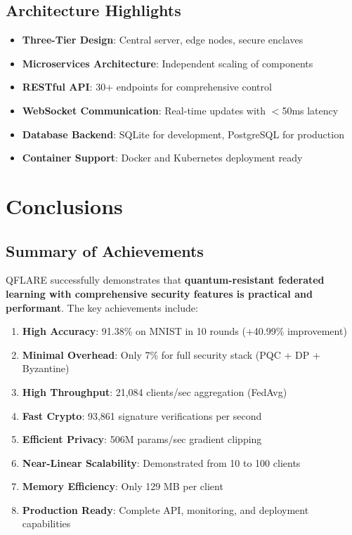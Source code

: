 \documentclass[12pt,a4paper]{article}
\begin{document}
\subsection{Architecture Highlights}

\begin{itemize}
    \item \textbf{Three-Tier Design}: Central server, edge nodes, secure enclaves
    \item \textbf{Microservices Architecture}: Independent scaling of components
    \item \textbf{RESTful API}: 30+ endpoints for comprehensive control
    \item \textbf{WebSocket Communication}: Real-time updates with $<$50ms latency
    \item \textbf{Database Backend}: SQLite for development, PostgreSQL for production
    \item \textbf{Container Support}: Docker and Kubernetes deployment ready
\end{itemize}

\section{Conclusions}

\subsection{Summary of Achievements}

QFLARE successfully demonstrates that \textbf{quantum-resistant federated learning with comprehensive security features is practical and performant}. The key achievements include:

\begin{enumerate}
    \item \textbf{High Accuracy}: 91.38\% on MNIST in 10 rounds (+40.99\% improvement)
    \item \textbf{Minimal Overhead}: Only 7\% for full security stack (PQC + DP + Byzantine)
    \item \textbf{High Throughput}: 21,084 clients/sec aggregation (FedAvg)
    \item \textbf{Fast Crypto}: 93,861 signature verifications per second
    \item \textbf{Efficient Privacy}: 506M params/sec gradient clipping
    \item \textbf{Near-Linear Scalability}: Demonstrated from 10 to 100 clients
    \item \textbf{Memory Efficiency}: Only 129 MB per client
    \item \textbf{Production Ready}: Complete API, monitoring, and deployment capabilities
\end{enumerate}
\end{document}
